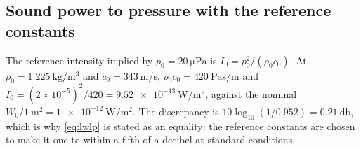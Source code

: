 \subsection{Sound power to pressure with the reference constants}

The reference intensity implied by $p_0=\SI{20}{\micro\pascal}$ is
$I_0 = p_0^2/(\rho_0 c_0)$. At $\rho_0=\SI{1.225}{\kilo\gram\per\metre\cubed}$
and $c_0=\SI{343}{\metre\per\second}$,
$\rho_0 c_0 = \SI{420}{\pascal\second\per\metre}$ and
$I_0 = (2\times10^{-5})^2/420 = \SI{9.52e-13}{\watt\per\metre\squared}$, against
the nominal $W_0/\SI{1}{\metre\squared} = \SI{1e-12}{\watt\per\metre\squared}$.
The discrepancy is $10\log_{10}(1/0.952)=\SI{0.21}{\decibel}$, which is why
\cref{eq:lwlp} is stated as an equality: the reference constants are chosen to
make it one to within a fifth of a decibel at standard conditions.
